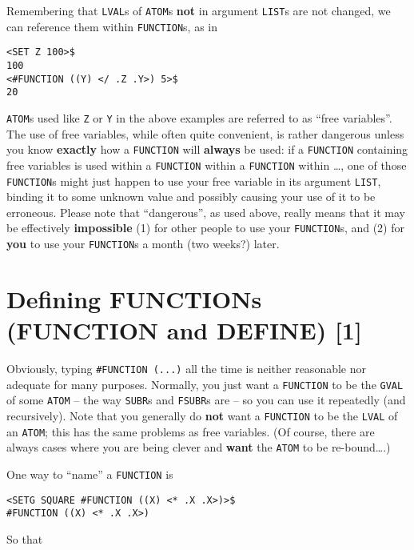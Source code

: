 \documentclass[a4paper]{scrbook}
\begin{document}
Remembering that \texttt{LVAL}s of \texttt{ATOM}s \textbf{not} in argument \texttt{LIST}s are not changed, we can reference
them within \texttt{FUNCTION}s, as in

\begin{verbatim}
<SET Z 100>$
100
<#FUNCTION ((Y) </ .Z .Y>) 5>$
20
\end{verbatim}

\texttt{ATOM}s used like \texttt{Z} or \texttt{Y} in the above examples are referred to as ``free variables''. The use of
free variables, while often quite convenient, is rather dangerous unless you know \textbf{exactly} how a \texttt{FUNCTION}
will \textbf{always} be used: if a \texttt{FUNCTION} containing free variables is used within a \texttt{FUNCTION} within a
\texttt{FUNCTION} within \ldots{}, one of those \texttt{FUNCTION}s might just happen to use your free variable in its
argument \texttt{LIST}, binding it to some unknown value and possibly causing your use of it to be erroneous. Please note
that ``dangerous'', as used above, really means that it may be effectively \textbf{impossible} (1) for other people to use
your \texttt{FUNCTION}s, and (2) for \textbf{you} to use your \texttt{FUNCTION}s a month (two weeks?) later.

\section{Defining FUNCTIONs (FUNCTION and DEFINE) {[}1{]}}\label{defining-functions-function-and-define-1}

Obviously, typing \texttt{\#FUNCTION\ (...)} all the time is neither reasonable nor adequate for many purposes. Normally,
you just want a \texttt{FUNCTION} to be the \texttt{GVAL} of some
\texttt{ATOM} -- the way \texttt{SUBR}s and \texttt{FSUBR}s are -- so you can use it repeatedly (and
recursively). Note that you generally do \textbf{not} want a \texttt{FUNCTION} to be the \texttt{LVAL} of an \texttt{ATOM};
this has the same problems as free variables. (Of course, there are always cases where you are being clever and
\textbf{want} the \texttt{ATOM} to be re-bound\ldots{}.)

One way to ``name'' a \texttt{FUNCTION} is

\begin{verbatim}
<SETG SQUARE #FUNCTION ((X) <* .X .X>)>$
#FUNCTION ((X) <* .X .X>)
\end{verbatim}

So that
\end{document}
